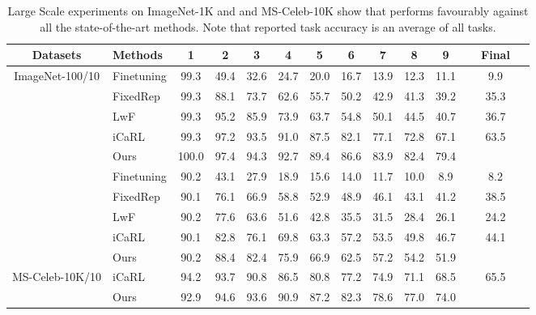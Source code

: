 \setlength{\tabcolsep}{0.2cm}
\begin{table*}[h]
    \caption{Large Scale experiments on ImageNet-1K and and MS-Celeb-10K show that \ours{} performs favourably against all the state-of-the-art methods. Note that reported task  accuracy is an average of all  tasks.}
    \label{tbl:imagenet}
    \begin{center}
        \begin{tabular}{c l c c c c c c c c c c}
        \toprule[0.4mm]
        \textbf{Datasets} & \textbf{Methods} & \textbf{1} & \textbf{2}& \textbf{3}& \textbf{4}& \textbf{5}& \textbf{6}& \textbf{7}& \textbf{8}& \textbf{9}& \textbf{Final} \\
            \midrule
            \multirow{6}{*}{ImageNet-100/10}
            & Finetuning & 99.3&49.4&32.6&24.7&20.0&16.7&13.9&12.3&11.1&9.9 \\
            & FixedRep & 99.3&88.1&73.7&62.6&55.7&50.2&42.9&41.3&39.2&35.3 \\
            & LwF \cite{li2018learning} & 99.3&95.2&85.9&73.9&63.7&54.8&50.1&44.5&40.7&36.7 \\
            & iCaRL \cite{rebuffi2017icarl} & 99.3&97.2&93.5&91.0&87.5&82.1&77.1&72.8&67.1&63.5 \\
            & Ours & 100.0&97.4&94.3&92.7&89.4&86.6&83.9&82.4&79.4& \ \ \ \ \ \ \ \ \ \ 
             \\
            \midrule
            \multirow{5}{*}{ImageNet-1K/10}
            & Finetuning & 90.2&43.1&27.9&18.9&15.6&14.0&11.7&10.0&8.9&8.2 \\
            & FixedRep & 90.1&76.1&66.9&58.8&52.9&48.9&46.1&43.1&41.2&38.5 \\
            & LwF \cite{li2018learning} & 90.2&77.6&63.6&51.6&42.8&35.5&31.5&28.4&26.1&24.2 \\
            & iCaRL \cite{rebuffi2017icarl} & 90.1&82.8&76.1&69.8&63.3&57.2&53.5&49.8&46.7&44.1 \\
            & Ours & 90.2&88.4&82.4&75.9&66.9&62.5&57.2&54.2&51.9& \ \ \ \ \ \ \ \  \\
            \midrule
            \multirow{2}{*}{MS-Celeb-10K/10}
            & iCaRL \cite{rebuffi2017icarl} & 94.2&93.7&90.8&86.5&80.8&77.2&74.9&71.1&68.5&65.5 \\
            & Ours & 92.9&94.6&93.6&90.9&87.2&82.3&78.6&77.0&74.0&  \ \ \ \ \ \ \ \  \\
            \bottomrule[0.4mm]
        \end{tabular}
    \end{center}
\end{table*}



